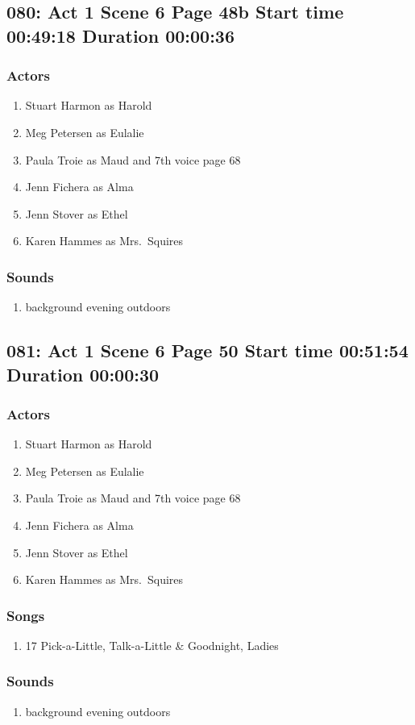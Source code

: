 \subsection{080: Act 1 Scene 6 Page 48b Start time 00:49:18 Duration 00:00:36}

\subsubsection{Actors}
\begin{enumerate}
\item Stuart Harmon as Harold
\item Meg Petersen as Eulalie
\item Paula Troie as Maud and 7th voice page 68
\item Jenn Fichera as Alma
\item Jenn Stover as Ethel
\item Karen Hammes as Mrs.~Squires
\end{enumerate}

\subsubsection{Sounds}
\begin{enumerate}
\item background evening outdoors
\end{enumerate}
\subsection{081: Act 1 Scene 6 Page 50 Start time 00:51:54 Duration 00:00:30}

\subsubsection{Actors}
\begin{enumerate}
\item Stuart Harmon as Harold
\item Meg Petersen as Eulalie
\item Paula Troie as Maud and 7th voice page 68
\item Jenn Fichera as Alma
\item Jenn Stover as Ethel
\item Karen Hammes as Mrs.~Squires
\end{enumerate}

\subsubsection{Songs}
\begin{enumerate}
\item 17 Pick-a-Little, Talk-a-Little \& Goodnight, Ladies
\end{enumerate}\subsubsection{Sounds}
\begin{enumerate}
\item background evening outdoors
\end{enumerate}
